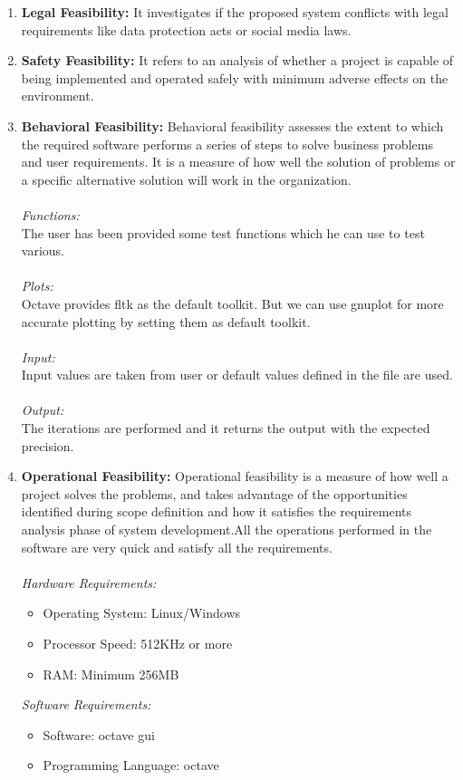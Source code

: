 \begin{enumerate}
\item \textbf{Legal Feasibility:} It investigates if the proposed system conflicts with legal requirements like data protection acts or social media laws.
\item \textbf{Safety Feasibility:} It refers to an analysis of whether a project is capable of being implemented and operated safely with minimum adverse effects on the environment.
        \item \textbf{Behavioral Feasibility:} Behavioral feasibility assesses the extent to which the required software performs a series of steps to solve business problems and user requirements. It is a measure of how well the solution of problems or a specific alternative solution will work in the organization.\\\\
\emph{Functions:}\\
The user has been provided some test functions which he can use to test various.\\\\
\emph{Plots:}\\
Octave provides fltk as the default toolkit. But we can use gnuplot for more accurate plotting by setting them as default toolkit.\\\\
\emph{Input:}\\
Input values are taken from user or default values defined in the file are used.\\\\
\emph{Output:}\\
The iterations are performed and it returns the output with the expected precision.
\item \textbf{Operational Feasibility:} Operational feasibility is a measure of how well a project solves the problems, and takes advantage of the opportunities identified during scope definition and how it satisfies the requirements analysis phase of system  development.All the operations performed in the software are very quick and satisfy all the requirements.\\\\
\emph{Hardware Requirements:}
\begin{itemize}
\item Operating System: Linux/Windows
\item Processor Speed: 512KHz or more
\item RAM: Minimum 256MB
\end{itemize}
         \emph{Software Requirements:}
\begin{itemize}
\item Software: octave gui
\item Programming Language: octave
\end{itemize}
\end{enumerate}
